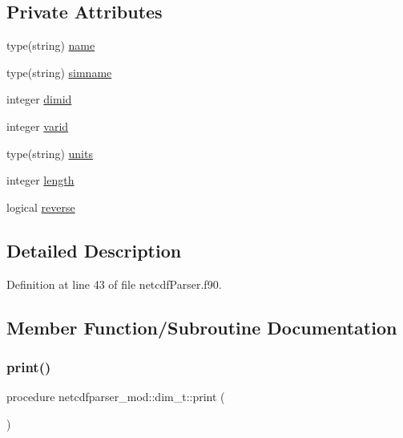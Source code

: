 \subsection*{Private Attributes}
\begin{DoxyCompactItemize}
\item 
type(string) \mbox{\hyperlink{structnetcdfparser__mod_1_1dim__t_ac9200bc4639dedfbd0fe2345ec44d448}{name}}
\item 
type(string) \mbox{\hyperlink{structnetcdfparser__mod_1_1dim__t_a14ab4a777ae4e2429332ddc08f875601}{simname}}
\item 
integer \mbox{\hyperlink{structnetcdfparser__mod_1_1dim__t_ae0eee1b309e61daefc73868795c35cc9}{dimid}}
\item 
integer \mbox{\hyperlink{structnetcdfparser__mod_1_1dim__t_a850c5b53b1fa2c09e19ee37896065897}{varid}}
\item 
type(string) \mbox{\hyperlink{structnetcdfparser__mod_1_1dim__t_a42d4e5dd93905b5b6912dd7675d0e1db}{units}}
\item 
integer \mbox{\hyperlink{structnetcdfparser__mod_1_1dim__t_ad099f35ecc70f2370e69eddfa21235dd}{length}}
\item 
logical \mbox{\hyperlink{structnetcdfparser__mod_1_1dim__t_aa9574f3a7c8ebb0acf0afa12c25a5180}{reverse}}
\end{DoxyCompactItemize}


\subsection{Detailed Description}


Definition at line 43 of file netcdf\+Parser.\+f90.



\subsection{Member Function/\+Subroutine Documentation}
\mbox{\label{structnetcdfparser__mod_1_1dim__t_aeb8d02051698385d0c46029a9a39c30f}} 
\subsubsection{\texorpdfstring{print()}{print()}}
{\footnotesize\ttfamily procedure netcdfparser\+\_\+mod\+::dim\+\_\+t\+::print (\begin{DoxyParamCaption}{ }\end{DoxyParamCaption})\hspace{0.3cm}{\ttfamily [private]}}



